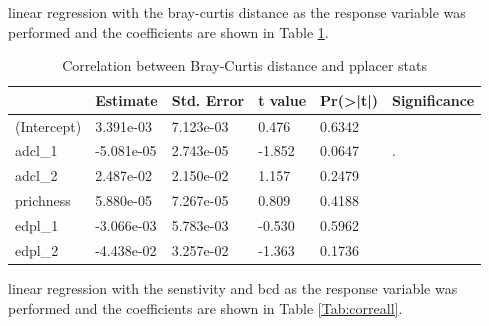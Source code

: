 \documentclass{article}
\begin{document}
linear regression with the bray-curtis distance as the response variable was performed and the coefficients are shown in Table \ref{Tab:correbcd}. \par
\begin{table}[ht]
\caption{Correlation between Bray-Curtis distance and pplacer stats}
\begin{tabular}{llllll}
\hline
            & Estimate &Std. Error &t value &Pr(>|t|) & Significance    \\
            \hline
(Intercept)&  3.391e-03 & 7.123e-03 &  0.476 &  0.6342&  \\
adcl_1     & -5.081e-05 & 2.743e-05 & -1.852 &  0.0647& .\\
adcl_2     &  2.487e-02 & 2.150e-02 &  1.157 &  0.2479&  \\
prichness  &  5.880e-05 & 7.267e-05 &  0.809 &  0.4188&  \\
edpl_1     & -3.066e-03 & 5.783e-03 & -0.530 &  0.5962&  \\
edpl_2     & -4.438e-02 & 3.257e-02 & -1.363 &  0.1736& \\
\hline
\end{tabular}
\label{Tab:correbcd}
\end{table}
linear regression with the senstivity and bcd as the response variable was performed and the coefficients are shown in Table \ref{Tab:correall}. \par
\end{document}
